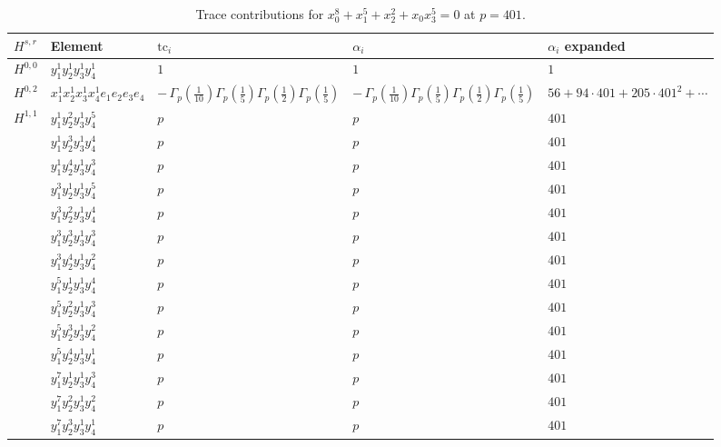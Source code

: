 \documentclass[11pt]{article}
\begin{document}
\begin{table}[ht]
\centering
\caption{Trace contributions for $x_0^{8} + x_1^{5} + x_2^{2} + x_0 x_3^{5} = 0$ at $p=401$.}\label{tab:deformed-78}
\renewcommand{\arraystretch}{1.1}
{\scriptsize
\begin{tabular}{@{}lllll@{}}
\toprule
$H^{s,r}$ & Element & $\mathrm{tc}_i$ & $\alpha_i$ & $\alpha_i$ expanded \\
\midrule
$H^{0,0}$ & $y_{1}^{1} y_{2}^{1} y_{3}^{1} y_{4}^{1}$ & $1$ & $1$ & $1$ \\
\midrule
$H^{0,2}$ & $x_{1}^{1} x_{2}^{1} x_{3}^{1} x_{4}^{1}  e_{1} e_{2} e_{3} e_{4}$ & $- \, \Gamma_p \left( \frac{1}{10} \right) \Gamma_p \left( \frac{1}{5} \right) \Gamma_p \left( \frac{1}{2} \right) \Gamma_p \left( \frac{1}{5} \right)$ & $- \, \Gamma_p \left( \frac{1}{10} \right) \Gamma_p \left( \frac{1}{5} \right) \Gamma_p \left( \frac{1}{2} \right) \Gamma_p \left( \frac{1}{5} \right)$ & $56{+}94{\cdot}401{+}205{\cdot}401^{2}{+}\cdots$ \\
\midrule
$H^{1,1}$ & $y_{1}^{1} y_{2}^{2} y_{3}^{1} y_{4}^{5}$ & $p \,$ & $p \,$ & $401$ \\
 & $y_{1}^{1} y_{2}^{3} y_{3}^{1} y_{4}^{4}$ & $p \,$ & $p \,$ & $401$ \\
 & $y_{1}^{1} y_{2}^{4} y_{3}^{1} y_{4}^{3}$ & $p \,$ & $p \,$ & $401$ \\
 & $y_{1}^{3} y_{2}^{1} y_{3}^{1} y_{4}^{5}$ & $p \,$ & $p \,$ & $401$ \\
 & $y_{1}^{3} y_{2}^{2} y_{3}^{1} y_{4}^{4}$ & $p \,$ & $p \,$ & $401$ \\
 & $y_{1}^{3} y_{2}^{3} y_{3}^{1} y_{4}^{3}$ & $p \,$ & $p \,$ & $401$ \\
 & $y_{1}^{3} y_{2}^{4} y_{3}^{1} y_{4}^{2}$ & $p \,$ & $p \,$ & $401$ \\
 & $y_{1}^{5} y_{2}^{1} y_{3}^{1} y_{4}^{4}$ & $p \,$ & $p \,$ & $401$ \\
 & $y_{1}^{5} y_{2}^{2} y_{3}^{1} y_{4}^{3}$ & $p \,$ & $p \,$ & $401$ \\
 & $y_{1}^{5} y_{2}^{3} y_{3}^{1} y_{4}^{2}$ & $p \,$ & $p \,$ & $401$ \\
 & $y_{1}^{5} y_{2}^{4} y_{3}^{1} y_{4}^{1}$ & $p \,$ & $p \,$ & $401$ \\
 & $y_{1}^{7} y_{2}^{1} y_{3}^{1} y_{4}^{3}$ & $p \,$ & $p \,$ & $401$ \\
 & $y_{1}^{7} y_{2}^{2} y_{3}^{1} y_{4}^{2}$ & $p \,$ & $p \,$ & $401$ \\
 & $y_{1}^{7} y_{2}^{3} y_{3}^{1} y_{4}^{1}$ & $p \,$ & $p \,$ & $401$ \\

\end{tabular}}
\end{table}
\end{document}
